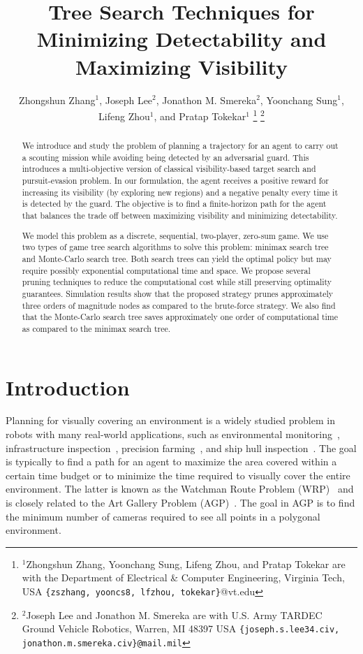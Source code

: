\documentclass[10 pt, conference]{ieeeconf}
\title{\LARGE \bf Tree Search Techniques for \\Minimizing Detectability and Maximizing Visibility}
\author{Zhongshun Zhang$^{1}$, Joseph Lee$^{2}$, Jonathon M. Smereka$^{2}$, Yoonchang Sung$^{1}$, Lifeng Zhou$^{1}$, and Pratap Tokekar$^{1}$%
\thanks{$^{1}$Zhongshun Zhang, Yoonchang Sung, Lifeng Zhou, and Pratap Tokekar are with the Department of Electrical \& Computer Engineering, Virginia Tech, USA {\tt\small \{zszhang, yooncs8, lfzhou,  tokekar\}}@vt.edu}%
\thanks{$^{2}$Joseph Lee and Jonathon M. Smereka are with U.S. Army TARDEC Ground Vehicle Robotics, Warren, MI 48397 USA {\tt\small \{joseph.s.lee34.civ, jonathon.m.smereka.civ\}@mail.mil}}%
}
\begin{document}
\maketitle
\thispagestyle{empty}
\pagestyle{empty}

\begin{abstract}
We introduce and study the problem of planning a trajectory for an agent to carry out a scouting mission while avoiding being detected by an adversarial guard. This introduces a multi-objective version of classical visibility-based target search and pursuit-evasion problem. In our formulation, the agent receives a positive reward for increasing its visibility (by exploring new regions) and a negative penalty every time it is detected by the guard. The objective is to find a finite-horizon path for the agent that balances the trade off between maximizing visibility and minimizing detectability. 

We model this problem as a discrete, sequential, two-player, zero-sum game. We use two types of game tree search algorithms to solve this problem: minimax search tree and Monte-Carlo search tree. Both search trees can yield the optimal policy but may require possibly exponential computational time and space. We propose several pruning techniques to reduce the computational cost while still preserving optimality guarantees. Simulation results show that the proposed strategy prunes approximately three orders of magnitude nodes as compared to the brute-force strategy. We also find that the Monte-Carlo search tree saves approximately one order of computational time as compared to the minimax search tree.
\end{abstract}
%
\section{Introduction}
%
Planning for visually covering an environment is a widely studied problem in robots with many real-world applications, such as environmental monitoring~\cite{tokekar2015visibility,tokekar2016polygon}, infrastructure inspection~\cite{cheng2008time}, precision farming~\cite{peng2017view}, and ship hull inspection~\cite{kim2015active}. The goal is typically to find a path for an agent to maximize the area covered within a certain time budget or to minimize the time required to visually cover the entire environment. The latter is known as the Watchman Route Problem (WRP)~\cite{chin1988optimum,carlsson1999finding,carlsson1999computing} and is closely related to the Art Gallery Problem (AGP)~\cite{o1987art}. The goal in AGP is to find the minimum number of cameras required to see all points in a polygonal environment. 
\end{document}

